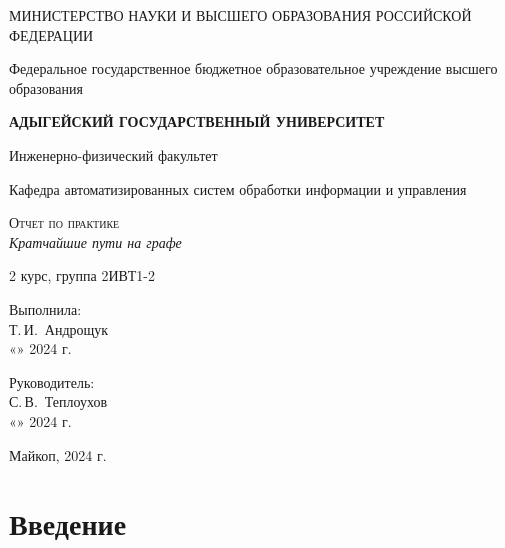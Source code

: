 \documentclass[12pt,a4paper]{scrartcl}
\begin{document}
 \begin{titlepage}
  \begin{center}
   \large
   МИНИСТЕРСТВО НАУКИ И ВЫСШЕГО ОБРАЗОВАНИЯ РОССИЙСКОЙ ФЕДЕРАЦИИ
   
   Федеральное государственное бюджетное образовательное учреждение высшего образования
   
   \textbf{АДЫГЕЙСКИЙ ГОСУДАРСТВЕННЫЙ УНИВЕРСИТЕТ}
   \vspace{0.25cm}
   
   Инженерно-физический факультет
   
   Кафедра автоматизированных систем обработки информации и управления
   \vfill

   \vfill
   
   \textsc{Отчет по практике}\\[5mm]
   
   {\LARGE \textit{Кратчайшие пути на графе}}
   \bigskip
   
   2 курс, группа 2ИВТ1-2
  \end{center}
  \vfill
  
  \newlength{\ML}
  \hfill\begin{minipage}{0.5\textwidth}
   Выполнила:\\
   \underline{\hspace{\ML}} Т.\,И.~Андрощук\\
   «\underline{\hspace{0.7cm}}» \underline{\hspace{2cm}} 2024 г.
  \end{minipage}%
  \bigskip
  
  \hfill\begin{minipage}{0.5\textwidth}
   Руководитель:\\
   \underline{\hspace{\ML}} С.\,В.~Теплоухов\\
   «\underline{\hspace{0.7cm}}» \underline{\hspace{2cm}} 2024 г.
  \end{minipage}%
  \vfill
  
  \begin{center}
   Майкоп, 2024 г.
  \end{center}
 \end{titlepage}
 

\section{Введение}
\label{sec:intro}
\end{document}
